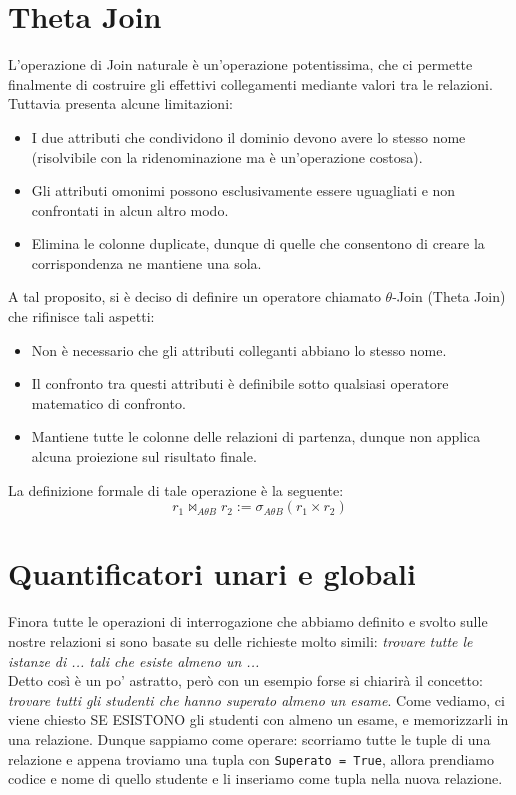\documentclass[12pt]{report}
\begin{document}
	\section{Theta Join}
	L'operazione di Join naturale è un'operazione potentissima, che ci permette finalmente di costruire gli effettivi collegamenti mediante valori tra le relazioni. Tuttavia presenta alcune limitazioni:
	\begin{itemize}
		\item I due attributi che condividono il dominio devono avere lo stesso nome (risolvibile con la ridenominazione ma è un'operazione costosa).
		
		\item Gli attributi omonimi possono esclusivamente essere uguagliati e non confrontati in alcun altro modo.
		
		\item Elimina le colonne duplicate, dunque di quelle che consentono di creare la corrispondenza ne mantiene una sola.
	\end{itemize}
	A tal proposito, si è deciso di definire un operatore chiamato $\theta$-Join (Theta Join) che rifinisce tali aspetti:
	\begin{itemize}
		\item Non è necessario che gli attributi colleganti abbiano lo stesso nome.
		
		\item Il confronto tra questi attributi è definibile sotto qualsiasi operatore matematico di confronto.
		
		\item Mantiene tutte le colonne delle relazioni di partenza, dunque non applica alcuna proiezione sul risultato finale.
	\end{itemize}
	La definizione formale di tale operazione è la seguente:
	\[
		r_1 \bowtie_{A\theta B} r_2 := \sigma_{A \theta B}(r_1 \times r_2)
	\]
	
	\section{Quantificatori unari e globali}
	Finora tutte le operazioni di interrogazione che abbiamo definito e svolto sulle nostre relazioni si sono basate su delle richieste molto simili: \textit{trovare tutte le istanze di ... tali che esiste almeno un ...}\\
	Detto così è un po' astratto, però con un esempio forse si chiarirà il concetto: \textit{trovare tutti gli studenti che hanno superato almeno un esame}. Come vediamo, ci viene chiesto SE ESISTONO gli studenti con almeno un esame, e memorizzarli in una relazione. Dunque sappiamo come operare: scorriamo tutte le tuple di una relazione e appena troviamo una tupla con \texttt{Superato = True}, allora prendiamo codice e nome di quello studente e li inseriamo come tupla nella nuova relazione.
	
\end{document}
